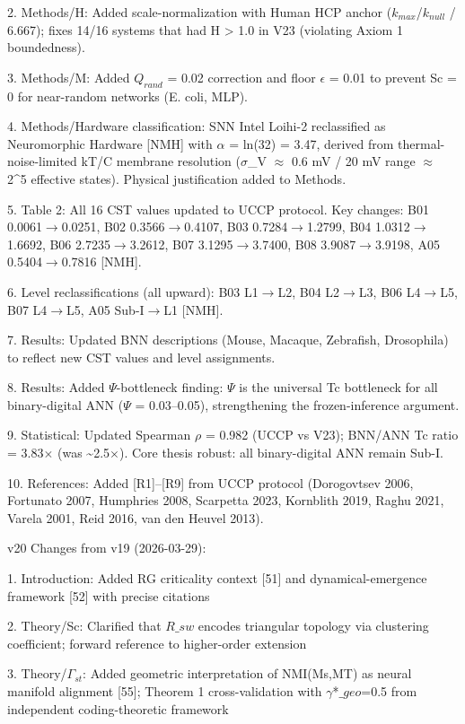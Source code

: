 \documentclass[a4paper,12pt]{article}
\begin{document}
2. Methods/H: Added scale-normalization with Human HCP anchor ($k_{max}$/$k_{null}$ / 6.667); fixes 14/16 systems that had H > 1.0 in V23 (violating Axiom 1 boundedness).

3. Methods/M: Added $Q_{rand}$ = 0.02 correction and floor $\epsilon$ = 0.01 to prevent Sc = 0 for near-random networks (E. coli, MLP).

4. Methods/Hardware classification: SNN Intel Loihi-2 reclassified as Neuromorphic Hardware [NMH] with $\alpha$ = ln(32) = 3.47, derived from thermal-noise-limited kT/C membrane resolution ($\sigma$_V $\approx$ 0.6 mV / 20 mV range $\approx$ 2^5 effective states). Physical justification added to Methods.

5. Table 2: All 16 CST values updated to UCCP protocol. Key changes: B01 0.0061$\rightarrow$0.0251, B02 0.3566$\rightarrow$0.4107, B03 0.7284$\rightarrow$1.2799, B04 1.0312$\rightarrow$1.6692, B06 2.7235$\rightarrow$3.2612, B07 3.1295$\rightarrow$3.7400, B08 3.9087$\rightarrow$3.9198, A05 0.5404$\rightarrow$0.7816 [NMH].

6. Level reclassifications (all upward): B03 L1$\rightarrow$L2, B04 L2$\rightarrow$L3, B06 L4$\rightarrow$L5, B07 L4$\rightarrow$L5, A05 Sub-I$\rightarrow$L1 [NMH].

7. Results: Updated BNN descriptions (Mouse, Macaque, Zebrafish, Drosophila) to reflect new CST values and level assignments.

8. Results: Added $\Psi$-bottleneck finding: $\Psi$ is the universal Tc bottleneck for all binary-digital ANN ($\Psi$ = 0.03--0.05), strengthening the frozen-inference argument.

9. Statistical: Updated Spearman $\rho$ = 0.982 (UCCP vs V23); BNN/ANN Tc ratio = 3.83$\times$ (was \textasciitilde{}2.5$\times$). Core thesis robust: all binary-digital ANN remain Sub-I.

10. References: Added [R1]--[R9] from UCCP protocol (Dorogovtsev 2006, Fortunato 2007, Humphries 2008, Scarpetta 2023, Kornblith 2019, Raghu 2021, Varela 2001, Reid 2016, van den Heuvel 2013).

v20 Changes from v19 (2026-03-29):

1. Introduction: Added RG criticality context [51] and dynamical-emergence framework [52] with precise citations

2. Theory/Sc: Clarified that $R\_{sw}$ encodes triangular topology via clustering coefficient; forward reference to higher-order extension

3. Theory/$\Gamma_{st}$: Added geometric interpretation of NMI(Ms,MT) as neural manifold alignment [55]; Theorem 1 cross-validation with $\gamma$*$\_geo$=0.5 from independent coding-theoretic framework
\end{document}
